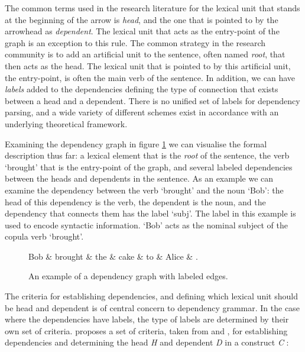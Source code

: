 The common terms used in the research literature for the lexical unit that stands at the beginning of the arrow is \textit{head}, and the one that is pointed to by the arrowhead as \textit{dependent}. The lexical unit that acts as the entry-point of the graph is an exception to this rule. The common strategy in the research community is to add an artificial unit to the sentence, often named \textit{root}, that then acts as the head. The lexical unit that is pointed to by this artificial unit, the entry-point, is often the main verb of the sentence. In addition, we can have \textit{labels} added to the dependencies defining the type of connection that exists between a head and a dependent. There is no unified set of labels for dependency parsing, and a wide variety of different schemes exist in accordance with an underlying theoretical framework. 

Examining the dependency graph in figure \ref{dep1} we can visualise the formal description thus far: a lexical element that is the \textit{root} of the sentence, the verb `brought' that is the entry-point of the graph, and several labeled dependencies between the heads and dependents in the sentence. As an example we can examine the dependency between the verb `brought' and the noun `Bob': the head of this dependency is the verb, the dependent is the noun, and the dependency that connects them has the label `subj'. The label in this example is used to encode syntactic information. `Bob' acts as the nominal subject of the copula verb `brought'.

\begin{figure}
    \begin{dependency}[]
        \begin{deptext}[column sep=1em, row sep=.1ex]
            Bob \& brought \& the \& cake \& to \& Alice \& . \\
        \end{deptext}
    \end{dependency}
    \caption{An example of a dependency graph with labeled edges.}
    \label{dep1}
\end{figure}

The criteria for establishing dependencies, and defining which lexical unit should be head and dependent is of central concern to dependency grammar. In the case where the dependencies have labels, the type of labels are determined by their own set of criteria.  proposes a set of criteria, taken from \citeauthor{Zwicky:85} and \citeauthor{Hudson:90}, for establishing dependencies and determining the head \textit{H} and dependent \textit{D} in a construct \textit{C} \cite{Zwicky:85, Hudson:90, Niv:05}:

